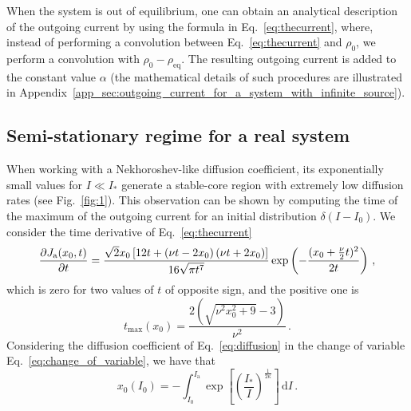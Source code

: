 When the system is out of equilibrium, one can obtain an analytical description of the outgoing current by using the formula in Eq.~\eqref{eq:thecurrent}, where, instead of performing a convolution between Eq.~\eqref{eq:thecurrent} and $\rho_0$, we perform a convolution with $\rho_0 - \rho_\text{eq}$. The resulting outgoing current is added to the constant value $\alpha$ (the mathematical details of such procedures are illustrated in Appendix~\ref{app_sec:outgoing_current_for_a_system_with_infinite_source}).


\subsection{Semi-stationary regime for a real system}
\label{subsec:semi_stationary_regime_for_a_real_system}


When working with a Nekhoroshev-like diffusion coefficient, its exponentially small values for $I \ll I_\ast$ generate a stable-core region with extremely low diffusion rates (see Fig.~\ref{fig:1}). This observation can be shown by computing the time of the maximum of the outgoing current for an initial distribution $\delta(I - I_0)$. We consider the time derivative of Eq.~\eqref{eq:thecurrent}
\begin{equation}
\pdv{J_\mathrm{a}(x_0, t)}{t} = \frac{\sqrt{2} x_0 \left[12 t + \left(\nu t - 2 x_0\right) \left(\nu t + 2 x_0\right)\right] }{16 \sqrt{\pi t^7}}\exp\left(-\frac{(x_0+\frac{\nu}{2}t)^2}{2t}\right)\,,
\end{equation}
which is zero for two values of $t$ of opposite sign, and the positive one is
\begin{equation}
    t_{\text{max}}(x_0) = \frac{2 \left(\sqrt{\nu^{2} x_0^{2} + 9} - 3\right)}{\nu^{2}}\,.
    \label{eq:taumax}
\end{equation}
Considering the diffusion coefficient of Eq.~\eqref{eq:diffusion} in the change of variable Eq.~\eqref{eq:change_of_variable}, we have that
\begin{equation}
    x_0(I_0) = {-}\int_{I_0}^{I_\mathrm{a}} \exp\left[\left(\frac{I_\ast}{I}\right)^{\frac{1}{2\kappa}}\right]\,\mathrm{d}I\,.
    \label{eq:peak_current_time}
\end{equation}

